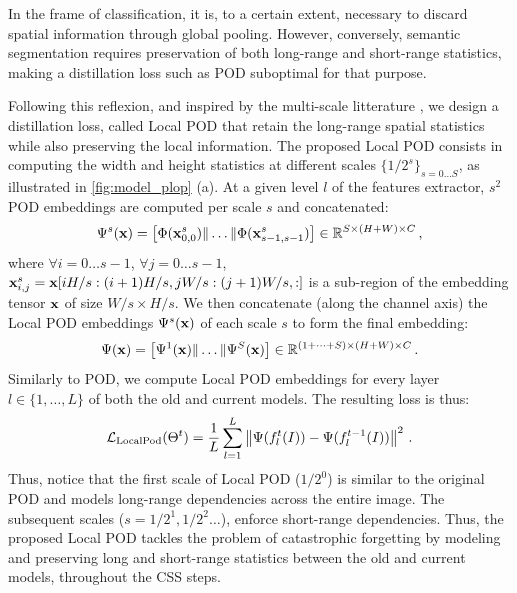 In the frame of classification, it is, to a certain extent, necessary to discard spatial information
through global pooling. However, conversely, semantic segmentation requires preservation of both
long-range and short-range statistics, making a distillation loss such as POD suboptimal for that
purpose.

Following this reflexion, and inspired by the multi-scale litterature
\citep{lazbnik2006spatial_pyramid_matching,he2014spatialpyramidpooling}, we design a distillation
loss, called Local POD that retain the long-range spatial statistics while also preserving the local
information. The proposed Local POD consists in computing the width and height statistics at
different scales $\{1/2^s\}_{s=0 \dots S}$, as illustrated in \autoref{fig:model_plop} (a). At a
given level $l$ of the features extractor, $s^2$ POD embeddings are computed per scale $s$ and
concatenated:
%
\begin{equation}
    \Psi^s(\mathbf{x}) = \left[ \Phi(\mathbf{x}^s_{0,0}) \| \dots \| \Phi(\mathbf{x}^s_{s-1,s-1}) \right] \in \mathbb{R}^{S \times (H + W) \times C}\,,
    \label{eq:localpod_embedding1}
\end{equation}
%
where $\forall i = 0 \dots s-1$, $\forall j = 0 \dots s-1$, $\mathbf{x}^s_{i,j} = \mathbf{x}[i H/s:(i+1) H/s, j
        W/s:(j+1) W/s,:]$ is a sub-region of the embedding tensor $\mathbf{x}$ of size $W/s \times H/s$. We then
concatenate (along the channel axis) the Local POD embeddings $\Psi^s(\mathbf{x})$ of each scale $s$ to
form the final embedding:
%
\begin{equation}
    \Psi(\mathbf{x}) = \left[ \Psi^1(\mathbf{x}) \| \dots \| \Psi^S(\mathbf{x}) \right] \in \mathbb{R}^{(1 + \dots + S) \times (H + W) \times C}\,.
    \label{eq:local_pod}
\end{equation}
%
Similarly to POD, we compute Local POD embeddings for every layer $l \in \{1, \dots, L\}$ of both
the old and current models. The resulting loss is thus:
%
\begin{equation}
    \mathcal{L}_{\scriptstyle\text{LocalPod}}(\Theta^t) = \frac{1}{L} \sum_{l = 1}^L \left\Vert  {\Psi}(f^t_l(I)) -  {\Psi}(f^{t-1}_l(I)) \right\Vert^2\,.
    \label{eq:local_pod_loss}
\end{equation}
%
Thus, notice that the first scale of Local POD ($1/2^0$) is similar to the original POD and models
long-range dependencies across the entire image. The subsequent scales ($s=1/2^1, 1/2^2 \dots$),
enforce short-range dependencies. Thus, the proposed Local POD tackles the problem of catastrophic
forgetting by modeling and preserving long and short-range statistics between the old and current
models, throughout the CSS steps.

